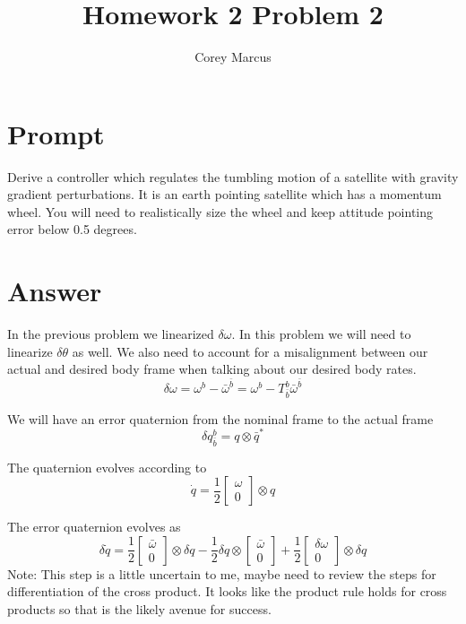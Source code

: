 \documentclass[]{article}
\title{Homework 2 Problem 2}
\author{Corey Marcus}
\begin{document}
\maketitle

\newcommand{\CrossProd}[1]{\left[ #1 \times \right]}
\newcommand{\VecToQuat}[1]{\begin{bmatrix} #1 \\ 0 \end{bmatrix}}
\newcommand{\LeftSuper}[2]{\tensor[^#1]{#2}{}}

\section{Prompt}

Derive a controller which regulates the tumbling motion of a satellite with gravity gradient perturbations. It is an earth pointing satellite which has a momentum wheel. You will need to realistically size the wheel and keep attitude pointing error below 0.5 degrees.

\section{Answer}

In the previous problem we linearized $\delta \omega$. In this problem we will need to linearize $\delta \theta$ as well.
We also need to account for a misalignment between our actual and desired body frame when talking about our desired body rates.
\begin{equation}
	\delta \omega = \omega^{b} - \bar{\omega}^{\bar{b}} = \omega^b - T^{b}_{\bar{b}} \bar{\omega}^{\bar{b}}
\end{equation}

We will have an error quaternion from the nominal frame to the actual frame
\begin{equation}
	\delta q_{\bar{b}}^b = q \otimes \bar{q}^*
\end{equation}

The quaternion evolves according to
\begin{equation}
	\dot{q} = \frac{1}{2} \VecToQuat{\omega}  \otimes q
\end{equation}

The error quaternion evolves as
\begin{equation}
	\delta \dot{q} = \frac{1}{2} \VecToQuat{\bar{\omega}} \otimes \delta q - \frac{1}{2} \delta q \otimes \VecToQuat{\bar{\omega}} + \frac{1}{2} \VecToQuat{\delta \omega} \otimes \delta q
\end{equation}
Note: This step is a little uncertain to me, maybe need to review the steps for differentiation of the cross product. It looks like the product rule holds for cross products so that is the likely avenue for success.
\end{document}
